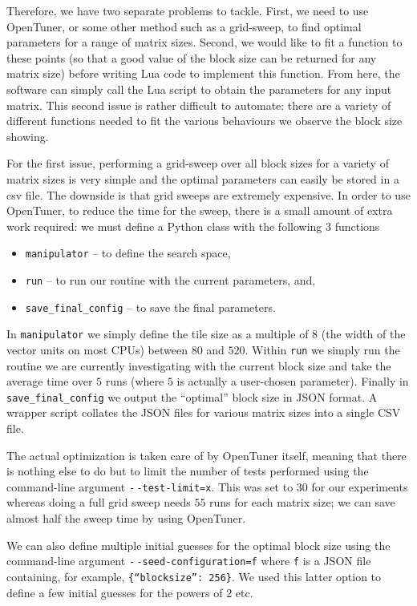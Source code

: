 \documentclass[a4paper,12pt]{article}
\begin{document}
Therefore,
we have two separate problems to tackle.
First,
we need to use OpenTuner,
or some other method such as a grid-sweep,
to find optimal parameters for a range of matrix sizes.
Second,
we would like to fit a function to these points
(so that a good value of the block size
can be returned for any matrix size)
before writing Lua code to implement this function.
From here,
the software can simply call the Lua script to obtain
the parameters for any input matrix.
This second issue is rather difficult to automate:
there are a variety of different functions needed to
fit the various behaviours we observe the block size showing.

For the first issue,
performing a grid-sweep over all block sizes for
a variety of matrix sizes
is very simple and the optimal parameters can easily be
stored in a csv file.
The downside is that grid sweeps are extremely expensive.
In order to use OpenTuner,
to reduce the time for the sweep,
there is a small amount of extra work required:
we must define a Python class with the following 3 functions
\begin{itemize}
\item \texttt{manipulator} -- to define the search space,
\item \texttt{run} -- to run our routine with the
  current parameters, and,
\item \texttt{save\_final\_config} -- to save the final parameters.
\end{itemize}

In \texttt{manipulator} we simply define the tile size as a
multiple of $8$ (the width of the vector units on most CPUs)
between $80$ and $520$.
Within \texttt{run} we simply run the routine we are currently
investigating with the current block size and take the average time
over $5$ runs (where $5$ is actually a user-chosen parameter).
Finally in \texttt{save\_final\_config} we output the
``optimal'' block size in JSON format.
A wrapper script collates the JSON files for various matrix sizes
into a single CSV file.

The actual optimization is taken care of by OpenTuner itself,
meaning that there is nothing else to do but to limit
the number of tests performed using the command-line argument
\texttt{-$\,$-test-limit=x}.
This was set to $30$ for our experiments whereas doing a full
grid sweep needs $55$ runs for each matrix size;
we can save almost half the sweep time by using OpenTuner.

We can also define multiple initial guesses for the optimal
block size using the command-line argument
\texttt{-$\,$-seed-configuration=f} where \texttt{f} is a JSON
file containing, for example, \texttt{\{``blocksize'': 256\}}.
We used this latter option to define a few initial guesses
for the powers of 2 etc.
\end{document}
